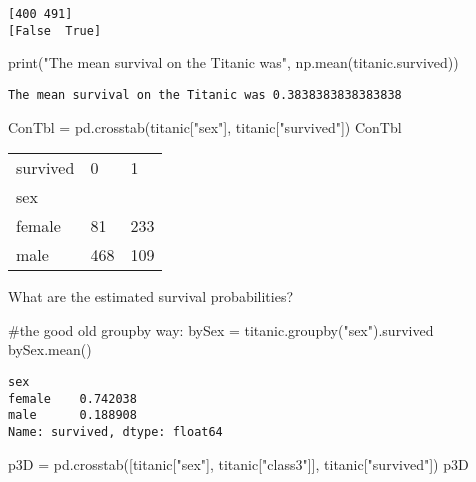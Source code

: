 \documentclass[
  letterpaper,
  DIV=11,
  numbers=noendperiod]{scrreprt}
\newenvironment{Shaded}{\begin{snugshade}}{\end{snugshade}}
\newcommand{\BuiltInTok}[1]{\textcolor[rgb]{0.00,0.23,0.31}{#1}}
\newcommand{\CommentTok}[1]{\textcolor[rgb]{0.37,0.37,0.37}{#1}}
\newcommand{\NormalTok}[1]{\textcolor[rgb]{0.00,0.23,0.31}{#1}}
\newcommand{\OperatorTok}[1]{\textcolor[rgb]{0.37,0.37,0.37}{#1}}
\newcommand{\StringTok}[1]{\textcolor[rgb]{0.13,0.47,0.30}{#1}}
\begin{document}
\begin{verbatim}
[400 491]
[False  True]
\end{verbatim}

\begin{Shaded}
\begin{Highlighting}[]
\BuiltInTok{print}\NormalTok{(}\StringTok{"The mean survival on the Titanic was"}\NormalTok{, np.mean(titanic.survived))}
\end{Highlighting}
\end{Shaded}

\begin{verbatim}
The mean survival on the Titanic was 0.3838383838383838
\end{verbatim}

\begin{Shaded}
\begin{Highlighting}[]
\NormalTok{ConTbl }\OperatorTok{=}\NormalTok{ pd.crosstab(titanic[}\StringTok{"sex"}\NormalTok{], titanic[}\StringTok{"survived"}\NormalTok{])}
\NormalTok{ConTbl}
\end{Highlighting}
\end{Shaded}

\begin{longtable}[]{@{}lll@{}}
\toprule()
survived & 0 & 1 \\
sex & & \\
\midrule()
\endhead
female & 81 & 233 \\
male & 468 & 109 \\
\bottomrule()
\end{longtable}

What are the estimated survival probabilities?

\begin{Shaded}
\begin{Highlighting}[]
\CommentTok{\#the good old groupby way:}
\NormalTok{bySex }\OperatorTok{=}\NormalTok{ titanic.groupby(}\StringTok{"sex"}\NormalTok{).survived}
\NormalTok{bySex.mean()}
\end{Highlighting}
\end{Shaded}

\begin{verbatim}
sex
female    0.742038
male      0.188908
Name: survived, dtype: float64
\end{verbatim}

\begin{Shaded}
\begin{Highlighting}[]
\NormalTok{p3D }\OperatorTok{=}\NormalTok{ pd.crosstab([titanic[}\StringTok{"sex"}\NormalTok{], titanic[}\StringTok{"class3"}\NormalTok{]], titanic[}\StringTok{"survived"}\NormalTok{])}
\NormalTok{p3D}
\end{Highlighting}
\end{Shaded}
\end{document}

